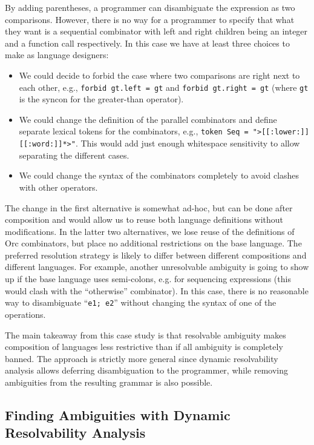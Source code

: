 \documentclass[acmsmall,review,anonymous]{acmart}\settopmatter{printfolios=true,printccs=false,printacmref=false}
\newcommand{\ocaml}{\lstinline[language={[objective]caml}]}
\newcommand{\syncon}{\lstinline[language=syncon]}
\begin{document}
\noindent
By adding parentheses, a programmer can disambiguate the
expression as two comparisons. However, there is no way for a
programmer to specify that what they want is a sequential
combinator with left and right children being an integer and a
function call respectively. In this case we have at least three
choices to make as language designers:

\begin{itemize}
\item We could decide to forbid the case where two comparisons are
  right next to each other, e.g., \syncon{forbid gt.left = gt} and
  \syncon{forbid gt.right = gt} (where \syncon{gt} is the syncon
  for the greater-than operator).
\item We could change the definition of the parallel combinators
  and define separate lexical tokens for the combinators, e.g.,
  \syncon{token Seq = ">[[:lower:]][[:word:]]*>"}. This would add
  just enough whitespace sensitivity to allow separating the
  different cases.
\item We could change the syntax of the combinators completely to
  avoid clashes with other operators.
\end{itemize}

\noindent
The change in the first alternative is somewhat ad-hoc, but can be done after composition
and would allow us to reuse both language definitions without
modifications. In the latter two alternatives, we lose reuse of
the definitions of Orc combinators, but place no additional
restrictions on the base language. The preferred resolution
strategy is likely to differ between different compositions and
different languages.
%
For example, another unresolvable ambiguity is going to show up if
the base language uses semi-colons, e.g. for sequencing
expressions (this would clash with the ``otherwise'' combinator).
In this case, there is no reasonable way to disambiguate
``\ocaml{e1; e2}'' without changing the syntax of one of the
operations.

The main takeaway from this case study is that resolvable
ambiguity makes composition of languages less restrictive than if
all ambiguity is completely banned. The approach is strictly more
general since dynamic resolvability analysis allows deferring
disambiguation to the programmer, while removing ambiguities from
the resulting grammar is also possible.


\subsection{Finding Ambiguities with Dynamic Resolvability Analysis} \label{sec:evaluation-ocaml}
\end{document}
